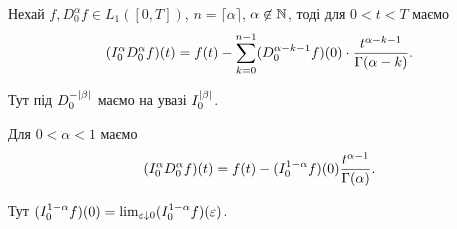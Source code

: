 \begin{th_formula}
    Нехай $f, D_0^\alpha f \in L_1([0,T])$, $n = \lceil \alpha \rceil$, $\alpha \not\in \mathbb{N}$, тоді для $0 < t < T$ маємо
    \begin{equation}
        (I_0^{\alpha} D_0^{\alpha} f)(t) = f(t) - \sum_{k = 0}^{n - 1} (D_0^{\alpha - k  - 1} f)(0) \cdot \frac{t^{\alpha - k - 1}}{\Gamma(\alpha - k)}.
    \end{equation}
\end{th_formula}
\begin{remark}
    Тут під $D_0^{-|\beta|}$ маємо на увазі $I_0^{|\beta|}$.
\end{remark}
\begin{example}
    Для $0 < \alpha < 1$ маємо
    \begin{equation}
        (I_0^{\alpha} D_0^{\alpha} f)(t) = f(t) - (I_0^{1 - \alpha} f)(0) \frac{t^{\alpha - 1}}{\Gamma(\alpha)}.
    \end{equation}
\end{example}
\begin{remark}
    Тут $(I_0^{1 - \alpha} f)(0) = \lim_{\varepsilon \downarrow 0} (I_0^{1 - \alpha} f)(\varepsilon)$.
\end{remark}
